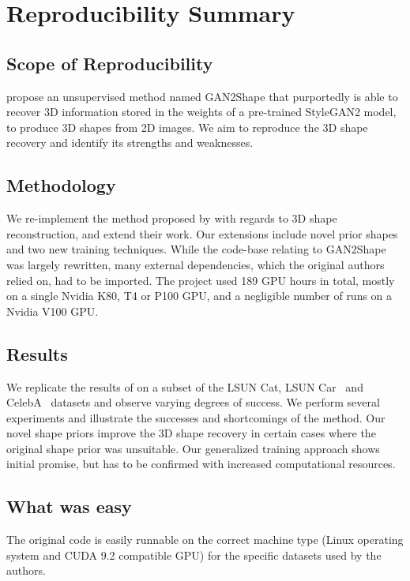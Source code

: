 \section*{\centering Reproducibility Summary}
\subsection*{Scope of Reproducibility}
\textcite{gan2shape} propose an unsupervised method named GAN2Shape that purportedly is able to recover 3D information stored in the weights of a pre-trained StyleGAN2 model, to produce 3D shapes from 2D images. We aim to reproduce the 3D shape recovery and identify its strengths and weaknesses.

\subsection*{Methodology}
We re-implement the method proposed by \textcite{gan2shape} with regards to 3D shape reconstruction, and extend their work. Our extensions include novel prior shapes and two new training techniques. While the code-base relating to GAN2Shape was largely rewritten, many external dependencies, which the original authors relied on, had to be imported. The project used 189 GPU hours in total, mostly on a single Nvidia K80, T4 or P100 GPU, and a negligible number of runs on a Nvidia V100 GPU.

\subsection*{Results}
We replicate the results of \textcite{gan2shape} on a subset of the LSUN Cat, LSUN Car~\cite{yu2015lsun} and CelebA~\cite{celeba} datasets and observe varying degrees of success. We perform several experiments and illustrate the successes and shortcomings of the method. Our novel shape priors improve the 3D shape recovery in certain cases where the original shape prior was unsuitable. Our generalized training approach shows initial promise, but has to be confirmed with increased computational resources.

\subsection*{What was easy}
The original code is easily runnable on the correct machine type (Linux operating system and CUDA 9.2 compatible GPU) for the specific datasets used by the authors.


